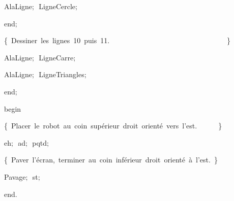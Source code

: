 {\vspace{\neglskip}\mbox{\blc  \blk\blk\blk\blk\idt  AlaLigne$;$\ LigneCercle$;$}\par 
\vspace{\neglskip}\mbox{\blc  \blk\blk\blk\idt  \mcl end\idt $;$}\par 
\vspace{\neglskip}\mbox{\blc  \blk\blk\idt  \cmt  \{\ Dessiner\ les\ lignes\ 10\ puis\ 11.\ \ \ \ \ \ \ \ \ \ \ \ \ \ \ \ \ \ \ \ \ \ \ \ \ \ \ \ \ \ \ \ \ \}\idt }\par 
\vspace{\neglskip}\mbox{\blc  \blk\blk\idt  AlaLigne$;$\ LigneCarre$;$}\par 
\vspace{\neglskip}\mbox{\blc  \blk\blk\idt  AlaLigne$;$\ LigneTriangles$;$}\par 
\vspace{\neglskip}\mbox{\blc  \idt  \mcl end\idt $;$}\par 
\medskip

\vspace{\neglskip}\mbox{\blc  \idt  \mcl begin\idt }\par 
\vspace{\neglskip}\mbox{\blc  \blk\idt  \cmt  \{\ Placer\ le\ robot\ au\ coin\ sup\'{e}rieur\ droit\ orient\'{e}\ vers\ l{'}est.\ \ \ \ \ \ \}\idt }\par 
\vspace{\neglskip}\mbox{\blc  \blk\idt  eh$;$\ ad$;$\ pqtd$;$}\par 
\vspace{\neglskip}\mbox{\blc  \blk\idt  \cmt  \{\ Paver\ l{'}\'{e}cran,\ terminer\ au\ coin\ inf\'{e}rieur\ droit\ orient\'{e}\ \`{a}\ l{'}est.\ \}\idt }\par 
\vspace{\neglskip}\mbox{\blc  \blk\idt  Pavage$;$\ st$;$\ }\par 
\vspace{\neglskip}\mbox{\blc  \idt  \mcl end\idt $.$}\par 

\medskip }

